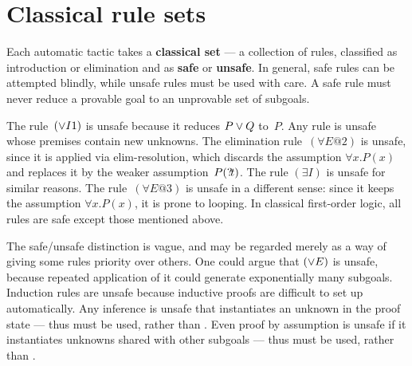 \section{Classical rule sets}
Each automatic tactic takes a {\bf classical set} --- a collection of
rules, classified as introduction or elimination and as {\bf safe} or {\bf
unsafe}.  In general, safe rules can be attempted blindly, while unsafe
rules must be used with care.  A safe rule must never reduce a provable
goal to an unprovable set of subgoals.  

The rule~$({\vee}I1)$ is unsafe because it reduces $P\vee Q$ to~$P$.  Any
rule is unsafe whose premises contain new unknowns.  The elimination
rule~$(\forall E@2)$ is unsafe, since it is applied via elim-resolution,
which discards the assumption $\forall x{.}P(x)$ and replaces it by the
weaker assumption~$P({?\!t})$.  The rule $({\exists}I)$ is unsafe for
similar reasons.  The rule~$(\forall E@3)$ is unsafe in a different sense:
since it keeps the assumption $\forall x{.}P(x)$, it is prone to looping.
In classical first-order logic, all rules are safe except those mentioned
above.

The safe/unsafe distinction is vague, and may be regarded merely as a way
of giving some rules priority over others.  One could argue that
$({\vee}E)$ is unsafe, because repeated application of it could generate
exponentially many subgoals.  Induction rules are unsafe because inductive
proofs are difficult to set up automatically.  Any inference is unsafe that
instantiates an unknown in the proof state --- thus 
must be used, rather than .  Even proof by assumption
is unsafe if it instantiates unknowns shared with other subgoals --- thus
 must be used, rather than .

